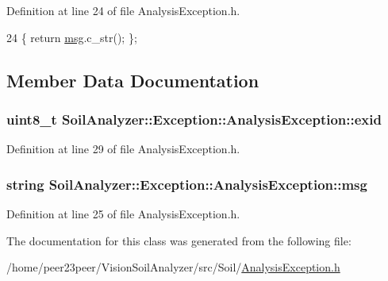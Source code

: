 Definition at line 24 of file Analysis\+Exception.\+h.


\begin{DoxyCode}
24 \{ \textcolor{keywordflow}{return} \hyperlink{class_soil_analyzer_1_1_exception_1_1_analysis_exception_a6bdd68db6677acb26738031746b761f4}{msg}.c\_str(); \};
\end{DoxyCode}


\subsection{Member Data Documentation}
\hypertarget{class_soil_analyzer_1_1_exception_1_1_analysis_exception_a2f79cb4a7d481fde0aabaf8930a123de}{}
\subsubsection[{exid}]{\setlength{\rightskip}{0pt plus 5cm}uint8\+\_\+t Soil\+Analyzer\+::\+Exception\+::\+Analysis\+Exception\+::exid\hspace{0.3cm}{\ttfamily [private]}}\label{class_soil_analyzer_1_1_exception_1_1_analysis_exception_a2f79cb4a7d481fde0aabaf8930a123de}


Definition at line 29 of file Analysis\+Exception.\+h.

\hypertarget{class_soil_analyzer_1_1_exception_1_1_analysis_exception_a6bdd68db6677acb26738031746b761f4}{}
\subsubsection[{msg}]{\setlength{\rightskip}{0pt plus 5cm}string Soil\+Analyzer\+::\+Exception\+::\+Analysis\+Exception\+::msg\hspace{0.3cm}{\ttfamily [private]}}\label{class_soil_analyzer_1_1_exception_1_1_analysis_exception_a6bdd68db6677acb26738031746b761f4}


Definition at line 25 of file Analysis\+Exception.\+h.



The documentation for this class was generated from the following file\+:\begin{DoxyCompactItemize}
\item 
/home/peer23peer/\+Vision\+Soil\+Analyzer/src/\+Soil/\hyperlink{_analysis_exception_8h}{Analysis\+Exception.\+h}\end{DoxyCompactItemize}

